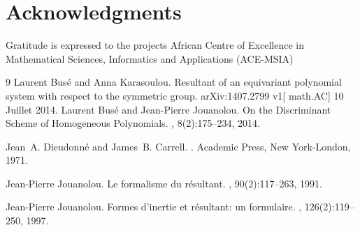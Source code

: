 \documentclass[12pt,a4paper,reqno]{amsart}
\theoremstyle{definition}
\theoremstyle{remark}
\numberwithin{equation}{section}
\begin{document}
\section*{Acknowledgments}
 Gratitude is expressed to the projects African Centre of Excellence in Mathematical Sciences, Informatics and Applications (ACE-MSIA)



\begin{thebibliography}{9}
Laurent Bus{\'e} and Anna Karasoulou.
\newblock Resultant of an equivariant polynomial system with respect to the symmetric group.
{ arXiv:1407.2799 v1}[ math.AC] 10 Juillet 2014.
Laurent Bus{\'e} and Jean-Pierre Jouanolou.
\newblock On the {D}iscriminant {S}cheme of {H}omogeneous {P}olynomials.
, 8(2):175--234, 2014.



Jean~A. Dieudonn{\'e} and James~B. Carrell.
.
\newblock Academic Press, New York-London, 1971.



Jean-Pierre Jouanolou.
\newblock Le formalisme du r\'esultant.
, 90(2):117--263, 1991.

Jean-Pierre Jouanolou.
\newblock Formes d'inertie et r\'esultant: un formulaire.
, 126(2):119--250, 1997.

%
%
%
%
















\end{thebibliography}
\end{document}

